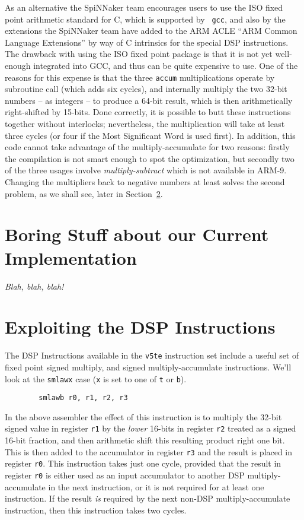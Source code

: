 As an alternative the SpiNNaker team encourages users to use the ISO
fixed point arithmetic standard for C, which is supported by {\tt
  gcc}, and also by the extensions the SpiNNaker team have added to
the ARM ACLE ``ARM Common Language Extensions'' by way of C intrinsics
for the special DSP instructions. The drawback with using the ISO
fixed point package is that it is not yet well-enough integrated into GCC,
and thus can be quite expensive to use. One of the reasons for this
expense is that the three {\tt accum} multiplications operate by
subroutine call (which adds six cycles), and internally multiply the
two 32-bit numbers -- as integers -- to produce a 64-bit result, which
is then arithmetically right-shifted by 15-bits. Done correctly, it is
possible to butt these instructions together without interlocks; nevertheless, the
multiplication will take at least three cycles (or four if the Most
Significant Word is used first). In addition, this code cannot take
advantage of the multiply-accumulate for two reasons: firstly the
compilation is not smart enough to spot the optimization, but secondly
two of the three usages involve {\em multiply-subtract} which is not
available in ARM-9. Changing the multipliers back to negative numbers
at least solves the second problem, as we shall see, later in Section~\ref{sc:dsp}.

\section{Boring Stuff about our Current Implementation}

{\it Blah, blah, blah!}

\section{Exploiting the DSP Instructions}\label{sc:dsp}

The DSP Instructions available in the {\tt v5te} instruction set
include a useful set of fixed point signed multiply, and signed
multiply-accumulate instructions. We'll look at the {\tt smlawx} case
({\tt x} is set to one of {\tt t} or {\tt b}).
\begin{verbatim}
        smlawb r0, r1, r2, r3
\end{verbatim}
In the above assembler the effect of this instruction is to multiply
the 32-bit signed value in register {\tt r1} by the {\em lower}
16-bits in register {\tt r2} treated as a signed 16-bit fraction, and
then arithmetic shift this resulting product right one bit. This is
then added to the accumulator in register {\tt r3} and the result is
placed in register {\tt r0}. This instruction takes just one cycle,
provided that the result in register {\tt r0} is either used as an
input accumulator to another DSP multiply-accumulate in the next
instruction, or it is not required for at least one instruction. If
the result {\em is} required by the next non-DSP multiply-accumulate
instruction, then this instruction takes two cycles.


